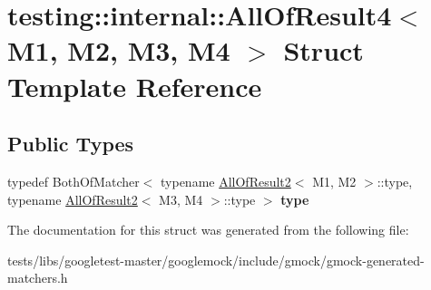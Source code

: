 \hypertarget{structtesting_1_1internal_1_1AllOfResult4}{}\section{testing\+:\+:internal\+:\+:All\+Of\+Result4$<$ M1, M2, M3, M4 $>$ Struct Template Reference}
\label{structtesting_1_1internal_1_1AllOfResult4}
\subsection*{Public Types}
\begin{DoxyCompactItemize}
\item 
\mbox{\label{structtesting_1_1internal_1_1AllOfResult4_ab277e20178bac632d4e5a39a1a407bbf}} 
typedef Both\+Of\+Matcher$<$ typename \hyperlink{structtesting_1_1internal_1_1AllOfResult2}{All\+Of\+Result2}$<$ M1, M2 $>$\+::type, typename \hyperlink{structtesting_1_1internal_1_1AllOfResult2}{All\+Of\+Result2}$<$ M3, M4 $>$\+::type $>$ {\bfseries type}
\end{DoxyCompactItemize}


The documentation for this struct was generated from the following file\+:\begin{DoxyCompactItemize}
\item 
tests/libs/googletest-\/master/googlemock/include/gmock/gmock-\/generated-\/matchers.\+h\end{DoxyCompactItemize}

